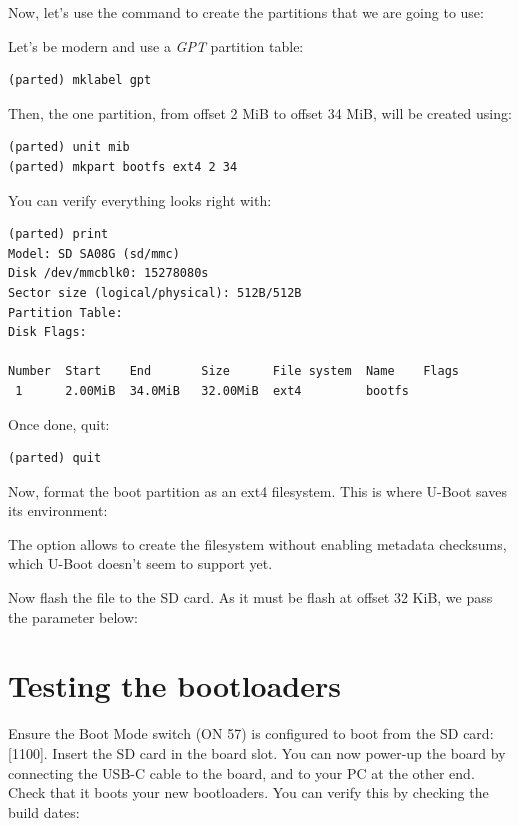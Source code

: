 Now, let's use the  command to create the partitions that
we are going to use:


Let's be modern and use a {\em GPT} partition table:

\begin{verbatim}
(parted) mklabel gpt
\end{verbatim}

Then, the one partition, from offset 2 MiB to offset 34 MiB, will be
created using:

\begin{verbatim}
(parted) unit mib
(parted) mkpart bootfs ext4 2 34
\end{verbatim}

You can verify everything looks right with:

\begin{verbatim}
(parted) print
Model: SD SA08G (sd/mmc)
Disk /dev/mmcblk0: 15278080s
Sector size (logical/physical): 512B/512B
Partition Table:
Disk Flags:

Number  Start    End       Size      File system  Name    Flags
 1      2.00MiB  34.0MiB   32.00MiB  ext4         bootfs

\end{verbatim}

Once done, quit:
\begin{verbatim}
(parted) quit
\end{verbatim}

Now, format the boot partition as an ext4 filesystem. This is where
U-Boot saves its environment:

The  option allows to create the filesystem
without enabling metadata checksums, which U-Boot doesn't seem to
support yet.

Now flash the  file to the SD card. As it must be
flash at offset 32 KiB, we pass the  parameter below:


\section{Testing the bootloaders}

Ensure the Boot Mode switch (ON 57) is configured to boot from the SD card:
[1100].
Insert the SD card in the board slot. You can now power-up the board
by connecting the USB-C cable to the board,  and
to your PC at the other end. Check that it boots your new bootloaders.
You can verify this by checking the build dates:

